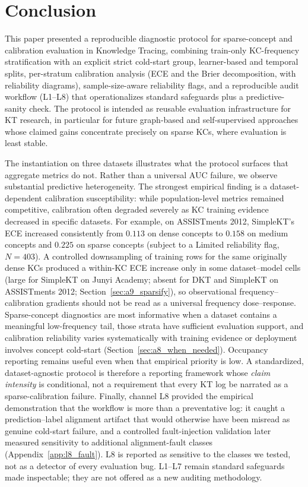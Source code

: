 \section{Conclusion}
\label{sec:conclusion}
This paper presented a reproducible diagnostic protocol for sparse-concept and calibration evaluation in Knowledge Tracing, combining train-only KC-frequency stratification with an explicit strict cold-start group, learner-based and temporal splits, per-stratum calibration analysis (ECE and the Brier decomposition, with reliability diagrams), sample-size-aware reliability flags, and a reproducible audit workflow (L1--L8) that operationalizes standard safeguards plus a predictive-sanity check. The protocol is intended as reusable evaluation infrastructure for KT research, in particular for future graph-based and self-supervised approaches whose claimed gains concentrate precisely on sparse KCs, where evaluation is least stable.

The instantiation on three datasets illustrates what the protocol surfaces that aggregate metrics do not. Rather than a universal AUC failure, we observe substantial predictive heterogeneity. The strongest empirical finding is a dataset-dependent calibration susceptibility: while population-level metrics remained competitive, calibration often degraded severely as KC training evidence decreased in specific datasets. For example, on ASSISTments 2012, SimpleKT's ECE increased consistently from $0.113$ on dense concepts to $0.158$ on medium concepts and $0.225$ on sparse concepts (subject to a Limited reliability flag, $N = 403$). A controlled downsampling of training rows for the same originally dense KCs produced a within-KC ECE increase only in some dataset--model cells (large for SimpleKT on Junyi Academy; absent for DKT and SimpleKT on ASSISTments 2012; Section~\ref{sec:a9_sparsify}), so observational frequency--calibration gradients should not be read as a universal frequency dose--response. Sparse-concept diagnostics are most informative when a dataset contains a meaningful low-frequency tail, those strata have sufficient evaluation support, and calibration reliability varies systematically with training evidence or deployment involves concept cold-start (Section~\ref{sec:a8_when_needed}). Occupancy reporting remains useful even when that empirical priority is low. A standardized, dataset-agnostic protocol is therefore a reporting framework whose \emph{claim intensity} is conditional, not a requirement that every KT log be narrated as a sparse-calibration failure. Finally, channel L8 provided the empirical demonstration that the workflow is more than a preventative log: it caught a prediction--label alignment artifact that would otherwise have been misread as genuine cold-start failure, and a controlled fault-injection validation later measured sensitivity to additional alignment-fault classes (Appendix~\ref{app:l8_fault}). L8 is reported as sensitive to the classes we tested, not as a detector of every evaluation bug. L1--L7 remain standard safeguards made inspectable; they are not offered as a new auditing methodology.

